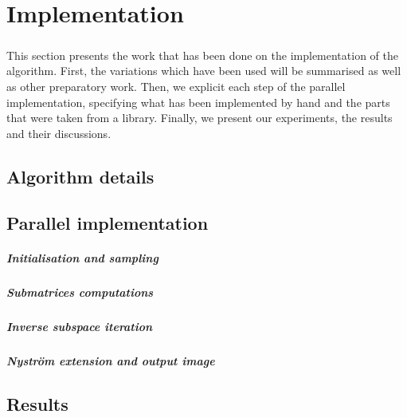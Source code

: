 \chapter{Implementation}

\paragraph{}
This section presents the work that has been done on the implementation of the algorithm.
First, the variations which have been used will be summarised as well as other preparatory work.
Then, we explicit each step of the parallel implementation, specifying what has been implemented by hand and the parts that were taken from a library.
Finally, we present our experiments, the results and their discussions.

\section{Algorithm details}


\section{Parallel implementation}


\paragraph{Initialisation and sampling}


\paragraph{Submatrices computations}


\paragraph{Inverse subspace iteration}


\paragraph{Nystr\"om extension and output image}


\section{Results}

